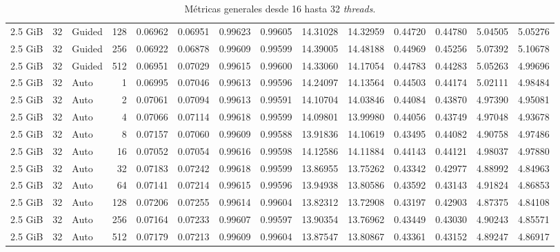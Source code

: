 \begin{table}[H]
\begin{adjustbox}{width=\textwidth, keepaspectratio}
\begin{tabular}{rrlrrrrrrrrrrr}
                    2.5 GiB & 32 & Guided & 128 & 0.06962 & 0.06951 & 0.99623 & 0.99605 & 14.31028 & 14.32959 & 0.44720 & 0.44780 & 5.04505 & 5.05276 \\
                    2.5 GiB & 32 & Guided & 256 & 0.06922 & 0.06878 & 0.99609 & 0.99599 & 14.39005 & 14.48188 & 0.44969 & 0.45256 & 5.07392 & 5.10678 \\
                    2.5 GiB & 32 & Guided & 512 & 0.06951 & 0.07029 & 0.99615 & 0.99600 & 14.33060 & 14.17054 & 0.44783 & 0.44283 & 5.05263 & 4.99696 \\
                    2.5 GiB & 32 & Auto & 1 & 0.06995 & 0.07046 & 0.99613 & 0.99596 & 14.24097 & 14.13564 & 0.44503 & 0.44174 & 5.02111 & 4.98484 \\
                    2.5 GiB & 32 & Auto & 2 & 0.07061 & 0.07094 & 0.99613 & 0.99591 & 14.10704 & 14.03846 & 0.44084 & 0.43870 & 4.97390 & 4.95081 \\
                    2.5 GiB & 32 & Auto & 4 & 0.07066 & 0.07114 & 0.99618 & 0.99599 & 14.09801 & 13.99980 & 0.44056 & 0.43749 & 4.97048 & 4.93678 \\
                    2.5 GiB & 32 & Auto & 8 & 0.07157 & 0.07060 & 0.99609 & 0.99588 & 13.91836 & 14.10619 & 0.43495 & 0.44082 & 4.90758 & 4.97486 \\
                    2.5 GiB & 32 & Auto & 16 & 0.07052 & 0.07054 & 0.99616 & 0.99598 & 14.12586 & 14.11884 & 0.44143 & 0.44121 & 4.98037 & 4.97880 \\
                    2.5 GiB & 32 & Auto & 32 & 0.07183 & 0.07242 & 0.99618 & 0.99599 & 13.86955 & 13.75262 & 0.43342 & 0.42977 & 4.88992 & 4.84963 \\
                    2.5 GiB & 32 & Auto & 64 & 0.07141 & 0.07214 & 0.99615 & 0.99596 & 13.94938 & 13.80586 & 0.43592 & 0.43143 & 4.91824 & 4.86853 \\
                    2.5 GiB & 32 & Auto & 128 & 0.07206 & 0.07255 & 0.99614 & 0.99604 & 13.82312 & 13.72908 & 0.43197 & 0.42903 & 4.87375 & 4.84108 \\
                    2.5 GiB & 32 & Auto & 256 & 0.07164 & 0.07233 & 0.99607 & 0.99597 & 13.90354 & 13.76962 & 0.43449 & 0.43030 & 4.90243 & 4.85571 \\
                    2.5 GiB & 32 & Auto & 512 & 0.07179 & 0.07213 & 0.99609 & 0.99604 & 13.87547 & 13.80867 & 0.43361 & 0.43152 & 4.89247 & 4.86917 \\
                    \bottomrule
                \end{tabular}
            \end{adjustbox}
            \caption{Métricas generales desde 16 hasta 32 \textit{threads}.}
            \label{tab:distance_metrics_3}
        \end{table}

